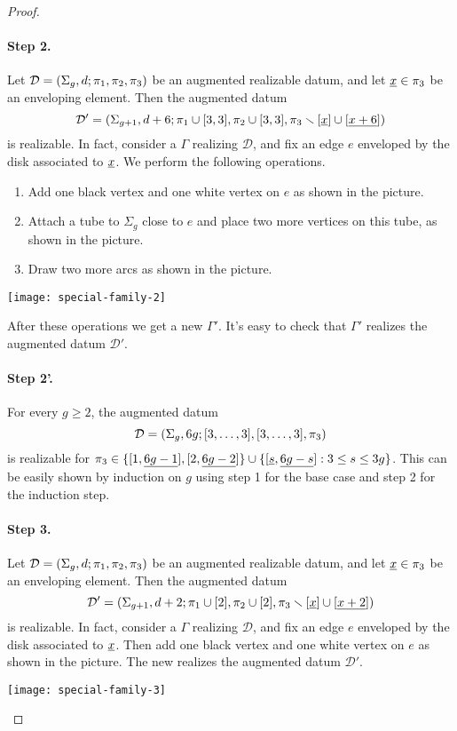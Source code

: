 \documentclass{article}
\begin{document}
\begin{proof}
\paragraph{Step 2.} Let $\mathcal{D}=\left(\Sigma_g,d;\pi_1,\pi_2,\pi_3\right)$ be an augmented realizable datum, and let $\underline{x}\in\pi_3$ be an enveloping element. Then the augmented datum
\[
\mathcal{D}'=\left(\Sigma_{g+1},d+6;\pi_1\cup[3,3],\pi_2\cup[3,3],\pi_3\smallsetminus[\underline{x}]\cup[\underline{x+6}]\right)
\]
is realizable. In fact, consider a \dessin{} $\Gamma$ realizing $\mathcal{D}$, and fix an edge $e$ enveloped by the disk associated to $\underline{x}$. We perform the following operations.
\begin{enumerate}
\item Add one black vertex and one white vertex on $e$ as shown in the picture.
\item Attach a tube to $\Sigma_g$ close to $e$ and place two more vertices on this tube, as shown in the picture.
\item Draw two more arcs as shown in the picture.
\end{enumerate}
\begin{center}
\texttt{[image: special-family-2]}
\end{center}
After these operations we get a new \dessin{} $\Gamma'$. It's easy to check that $\Gamma'$ realizes the augmented datum $\mathcal{D}'$.

\paragraph{Step 2'.} For every $g\ge 2$, the augmented datum
\[
\mathcal{D}=\left(\Sigma_g,6g;[3,\ldots,3],[3,\ldots,3],\pi_3\right)
\]
is realizable for $\pi_3\in\{[1,\underline{6g-1}],[2,\underline{6g-2}]\}\cup\{[\underline{s},\underline{6g-s}]:3\le s\le 3g\}$. This can be easily shown by induction on $g$ using step 1 for the base case and step 2 for the induction step.

\begingroup
{}
\setlength{\columnsep}{2em}
\begin{paracol}{2}
\paragraph{Step 3.} Let $\mathcal{D}=\left(\Sigma_g,d;\pi_1,\pi_2,\pi_3\right)$ be an augmented realizable datum, and let $\underline{x}\in\pi_3$ be an enveloping element. Then the augmented datum
\[
\mathcal{D}'=\left(\Sigma_{g+1},d+2;\pi_1\cup[2],\pi_2\cup[2],\pi_3\smallsetminus[\underline{x}]\cup[\underline{x+2}]\right)
\]
is realizable. In fact, consider a \dessin{} $\Gamma$ realizing $\mathcal{D}$, and fix an edge $e$ enveloped by the disk associated to $\underline{x}$. Then add one black vertex and one white vertex on $e$ as shown in the picture. The new \dessin{} realizes the augmented datum $\mathcal{D'}$.
\switchcolumn
\begin{center}
\texttt{[image: special-family-3]}
\end{center}
\end{paracol}


\end{proof}
\end{document}
